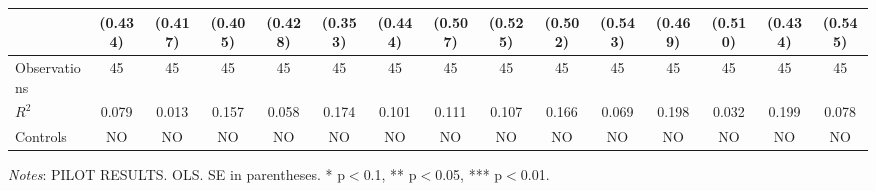 \documentclass[11pt]{article}
\begin{document}
\begin{landscape}
\begin{table}[!htbp]
\begin{threeparttable}
\begin{tabular}{l||cc|cc|cc|cc|cc||cc||cc}
 & (0.434) & (0.417) & (0.405) & (0.428) & (0.353) & (0.444) & (0.507) & (0.525) & (0.502) & (0.543) & (0.469) & (0.510) & (0.434) & (0.545) \\
\midrule
Observations & 45 & 45 & 45 & 45 & 45 & 45 & 45 & 45 & 45 & 45 & 45 & 45 & 45 & 45 \\
$R^2$ & 0.079 & 0.013 & 0.157 & 0.058 & 0.174 & 0.101 & 0.111 & 0.107 & 0.166 & 0.069 & 0.198 & 0.032 & 0.199 & 0.078 \\
Controls & NO & NO & NO & NO & NO & NO & NO & NO & NO & NO & NO & NO & NO & NO \\
\bottomrule
\end{tabular}
\begin{tablenotes}[flushleft]
\footnotesize
\item \textit{Notes}: PILOT RESULTS. OLS. SE in parentheses. * p$<$0.1, ** p$<$0.05, *** p$<$0.01.
\end{tablenotes}
\end{threeparttable}
\end{table}
\end{landscape}
\FloatBarrier
\end{document}
